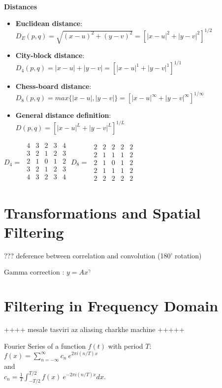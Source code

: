 \documentclass{../cheat}
\begin{document}
\begin{multicols}{3}
	\textbf{Distances}
	\begin{itemize}
		\item \textbf{Euclidean distance}:\\
		$D_E(p,q)=\sqrt{(x-u)^2+(y-v)^2}=[|x-u|^2+|y-v|^2]^{1/2}$
		\item \textbf{City-block distance}:\\
		$D_4(p,q)=|x-u|+|y-v|=[|x-u|^1+|y-v|^1]^{1/1}$
		\item \textbf{Chess-board distance}:\\
		$D_8(p,q)=max\{|x-u|,|y-v|\}=[|x-u|^\infty+|y-v|^\infty]^{1/\infty}$
		\item \textbf{General distance definition}:\\
		$D(p,q)=[|x-u|^L+|y-v|^L]^{1/L}$
	\end{itemize}
	
	 \hfill $D_4=$
	$\begin{matrix}
		4	&  3	&  2	&  3	&  4	\\
		3	&  2	&  1	&  2	&  3	\\
		2	&  1	&  0 	&  1	&  2	\\
		3	&  2	&  1	&  2	&  3	\\
		4	&  3	&  2	&  3	&  4	\\	
	\end{matrix}$
	\hfill $D_8=$
	$\begin{matrix}
		2	&  2	&  2	&  2	&  2	\\
		2	&  1	&  1	&  1	&  2	\\
		2	&  1	&  0 	&  1	&  2	\\
		2	&  1	&  1	&  1	&  2	\\
		2	&  2	&  2	&  2	&  2	
	\end{matrix}$\hfill \null

	
	\section{Transformations and Spatial Filtering}
	??? deference between correlation and convolution (180' rotation)
	
	Gamma correction : $y=A x^\gamma$
	
	\section{Filtering in Frequency Domain}
	++++ mesale tasviri az aliasing charkhe machine +++++
	
	Fourier Series of a function $f(t)$ with period $T$:\\
	$f(x)=\sum_{n=-\infty}^\infty c_n\ e^{2\pi i(n/T) x} $\\
	and \\
	$c_n = \frac{1}{T} \int_{-T/2}^{T/2} f(x)\ e^{-2\pi i(n/T) x} dx.$
	

\end{multicols}
\end{document}
